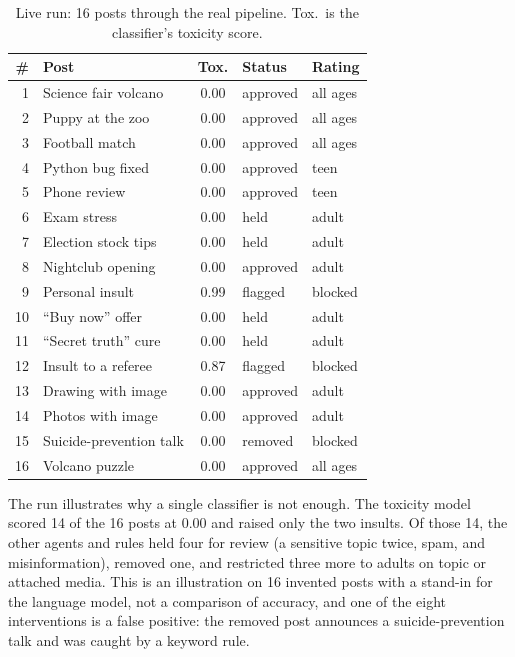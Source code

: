 \documentclass[conference]{IEEEtran}
\begin{document}
\begin{table}[t]
\caption{Live run: 16 posts through the real pipeline. Tox.\ is the classifier's toxicity score.}
\label{tab:live}
\centering
\footnotesize
\begin{tabular}{@{}rp{}cll@{}}
\toprule
\# & Post & Tox. & Status & Rating \\
\midrule
1 & Science fair volcano & 0.00 & approved & all ages \\
2 & Puppy at the zoo & 0.00 & approved & all ages \\
3 & Football match & 0.00 & approved & all ages \\
4 & Python bug fixed & 0.00 & approved & teen \\
5 & Phone review & 0.00 & approved & teen \\
6 & Exam stress & 0.00 & held & adult \\
7 & Election stock tips & 0.00 & held & adult \\
8 & Nightclub opening & 0.00 & approved & adult \\
9 & Personal insult & 0.99 & flagged & blocked \\
10 & ``Buy now'' offer & 0.00 & held & adult \\
11 & ``Secret truth'' cure & 0.00 & held & adult \\
12 & Insult to a referee & 0.87 & flagged & blocked \\
13 & Drawing with image & 0.00 & approved & adult \\
14 & Photos with image & 0.00 & approved & adult \\
15 & Suicide-prevention talk & 0.00 & removed & blocked \\
16 & Volcano puzzle & 0.00 & approved & all ages \\
\bottomrule
\end{tabular}
\end{table}

The run illustrates why a single classifier is not enough. The toxicity model scored 14 of the 16 posts at 0.00 and raised only the two insults. Of those 14, the other agents and rules held four for review (a sensitive topic twice, spam, and misinformation), removed one, and restricted three more to adults on topic or attached media. This is an illustration on 16 invented posts with a stand-in for the language model, not a comparison of accuracy, and one of the eight interventions is a false positive: the removed post announces a suicide-prevention talk and was caught by a keyword rule.
\end{document}

